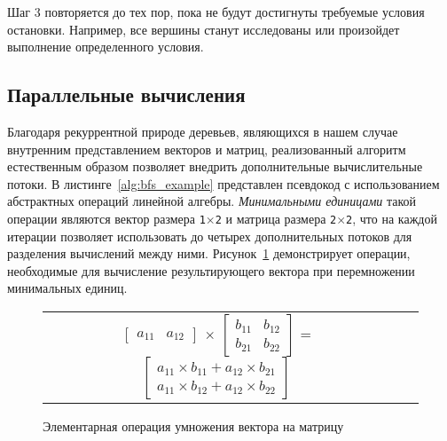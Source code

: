 \noindent Шаг 3 повторяется до тех пор, пока не будут достигнуты требуемые условия остановки. Например, все вершины станут исследованы или произойдет выполнение определенного условия.



\subsection{Параллельные вычисления}
\noindent Благодаря рекуррентной природе деревьев, являющихся в нашем случае внутренним представлением векторов и матриц, реализованный алгоритм естественным образом позволяет внедрить дополнительные вычислительные потоки. В листинге~\ref{alg:bfs_example} представлен псевдокод с использованием абстрактных операций линейной алгебры. \textit{Минимальными единицами} такой операции являются вектор размера \texttt{1$\times$2} и матрица размера \texttt{2$\times$2}, что на каждой итерации позволяет использовать до четырех дополнительных потоков для разделения вычислений между ними. Рисунок~\ref{ab_product} демонстрирует операции, необходимые для вычисление результирующего вектора при перемножении минимальных единиц. 

\begin{figure}[h]
\begin{center}
    \begin{tabular}{ccc}
        $\begin{bmatrix} a_{11} & a_{12} \end{bmatrix}$
        $\times$
        $\begin{bmatrix} b_{11} & b_{12} \\ b_{21} & b_{22} \end{bmatrix}$
        =
        $\begin{bmatrix} a_{11} \times b_{11} + a_{12} \times b_{21} \\ a_{11} \times b_{12} + a_{12} \times b_{22} \end{bmatrix}$
    \end{tabular}
\end{center}
\caption{Элементарная операция умножения вектора на матрицу}
\label{ab_product}
\end{figure}
\lstset{style=codelistingstyle}

